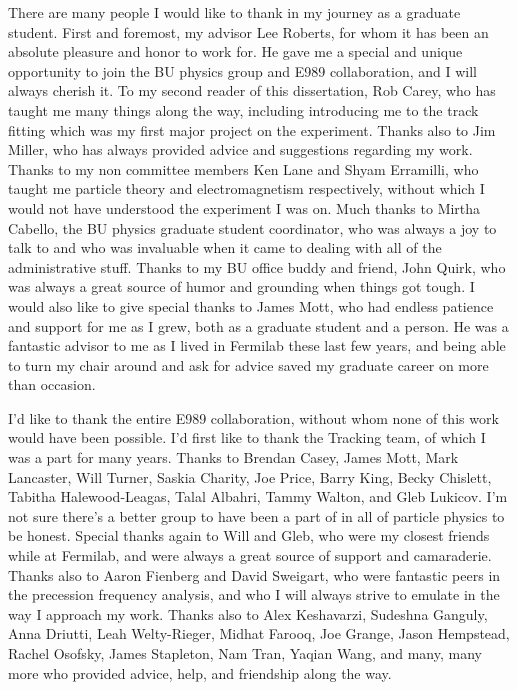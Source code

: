 

There are many people I would like to thank in my journey as a graduate student. First and foremost, my advisor Lee Roberts, for whom it has been an absolute pleasure and honor to work for. He gave me a special and unique opportunity to join the BU physics group and E989 collaboration, and I will always cherish it. To my second reader of this dissertation, Rob Carey, who has taught me many things along the way, including introducing me to the track fitting which was my first major project on the experiment. Thanks also to Jim Miller, who has always provided advice and suggestions regarding my work. Thanks to my non \gmtwo committee members Ken Lane and Shyam Erramilli, who taught me particle theory and electromagnetism respectively, without which I would not have understood the experiment I was on. Much thanks to Mirtha Cabello, the BU physics graduate student coordinator, who was always a joy to talk to and who was invaluable when it came to dealing with all of the administrative stuff. Thanks to my BU office buddy and friend, John Quirk, who was always a great source of humor and grounding when things got tough. I would also like to give special thanks to James Mott, who had endless patience and support for me as I grew, both as a graduate student and a person. He was a fantastic advisor to me as I lived in Fermilab these last few years, and being able to turn my chair around and ask for advice saved my graduate career on more than occasion.


I'd like to thank the entire E989 collaboration, without whom none of this work would have been possible. I'd first like to thank the Tracking team, of which I was a part for many years. Thanks to Brendan Casey, James Mott, Mark Lancaster, Will Turner, Saskia Charity, Joe Price, Barry King, Becky Chislett, Tabitha Halewood-Leagas, Talal Albahri, Tammy Walton, and Gleb Lukicov. I'm not sure there's a better group to have been a part of in all of particle physics to be honest. Special thanks again to Will and Gleb, who were my closest friends while at Fermilab, and were always a great source of support and camaraderie. Thanks also to Aaron Fienberg and David Sweigart, who were fantastic peers in the precession frequency analysis, and who I will always strive to emulate in the way I approach my work. Thanks also to Alex Keshavarzi, Sudeshna Ganguly, Anna Driutti, Leah Welty-Rieger, Midhat Farooq, Joe Grange, Jason Hempstead, Rachel Osofsky, James Stapleton, Nam Tran, Yaqian Wang, and many, many more who provided advice, help, and friendship along the way. 


